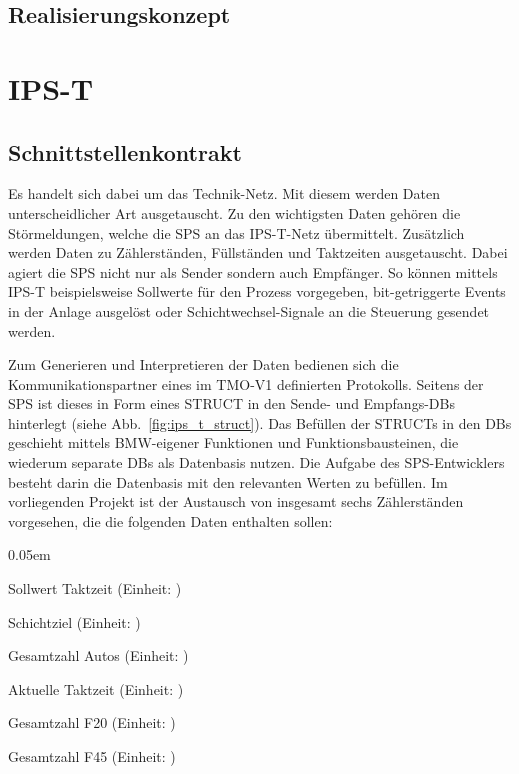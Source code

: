 
\subsection{Realisierungskonzept}
\label{subsec:ips_l_concept}


\section{IPS-T}
\label{sec:ips_t}

\subsection{Schnittstellenkontrakt}
\label{subsec:ips_t_contract}

 Es handelt sich dabei um das Technik-Netz. Mit diesem werden Daten unterscheidlicher Art ausgetauscht. Zu den wichtigsten Daten gehören die Störmeldungen, welche die SPS an das IPS-T-Netz übermittelt. Zusätzlich werden Daten zu Zählerständen, Füllständen und Taktzeiten ausgetauscht. Dabei agiert die SPS nicht nur als Sender sondern auch Empfänger. So können mittels IPS-T beispielsweise Sollwerte für den Prozess  vorgegeben, bit-getriggerte Events in der Anlage ausgelöst oder Schichtwechsel-Signale an die Steuerung gesendet werden. 


Zum Generieren und Interpretieren der Daten bedienen sich die Kommunikationspartner eines im TMO-V1 definierten Protokolls. Seitens der SPS ist dieses in Form eines STRUCT in den Sende- und Empfangs-DBs hinterlegt (siehe Abb.~\ref{fig:ips_t_struct}). Das Befüllen der STRUCTs in den DBs geschieht mittels BMW-eigener Funktionen und Funktionsbausteinen, die wiederum separate DBs als Datenbasis nutzen. Die Aufgabe des SPS-Entwicklers besteht darin die Datenbasis mit den relevanten Werten zu befüllen. Im vorliegenden Projekt ist der Austausch von insgesamt sechs Zählerständen vorgesehen, die die folgenden Daten enthalten sollen: 

\begin{description}
    \itemsep 0.05em
    \item [IPS-T -> SPS] Sollwert Taktzeit (Einheit: )
    \item [IPS-T -> SPS] Schichtziel (Einheit: \einh{}{\cars})
    \item [SPS -> IPS-T] Gesamtzahl Autos (Einheit: \einh{}{\cars})
    \item [SPS -> IPS-T] Aktuelle Taktzeit (Einheit: )
    \item [SPS -> IPS-T] Gesamtzahl F20 (Einheit: \einh{}{\cars})
    \item [SPS -> IPS-T] Gesamtzahl F45 (Einheit: \einh{}{\cars})
\end{description}

